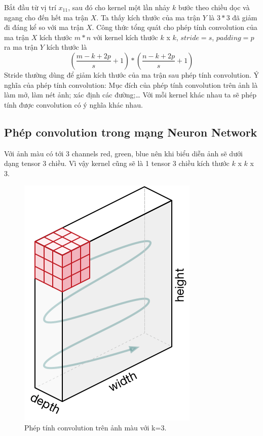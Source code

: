 \begin{itemize}
Bắt đầu từ vị trí $x_{11}$, sau đó cho kernel một lần nhảy $k$ bước theo chiều dọc và ngang cho đến hết ma trận $X$. Ta thấy kích thước của ma trận $Y$ là $3*3$ đã giảm đi đáng kể so với ma trận $X$.
Công thức tổng quát cho phép tính convolution của ma trận $X$ kích thước $m*n$ với kernel kích thước $k$ x $k$, $stride = s$, $padding = p$ ra ma trận $Y$ kích thước là $$(\frac{m-k+2p}{s}+1) * (\frac{n-k+2p}{s}+1)$$
Stride thường dùng để giảm kích thước của ma trận sau phép tính convolution.
Ý nghĩa của phép tính convolution:
Mục đích của phép tính convolution trên ảnh là làm mở, làm nét ảnh; xác định các đường;… Với mỗi kernel khác nhau ta sẽ phép tính được convolution có ý nghĩa khác nhau. 
\end{itemize} 
\subsection{Phép convolution trong mạng Neuron Network}
Với ảnh màu có tới 3 channels red, green, blue nên khi biểu diễn ảnh sẽ dưới dạng tensor 3 chiều. Vì vậy kernel cũng sẽ là 1 tensor 3 chiều kích thước $k$ x $k$ x $3$.

\FloatBarrier
\begin{figure}[htp]
\begin{center}
\includegraphics[scale=0.5]{chap2/c2_figs/13.png}
\end{center}
\caption{Phép tính convolution trên ảnh màu với k=3.}
\label{fig:padding,stride}
\end{figure}
\FloatBarrier

